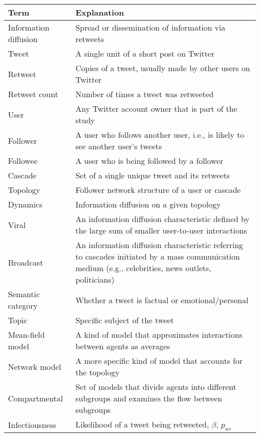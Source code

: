 \documentclass[11pt,a4paper]{article}
\begin{document}
\begin{table}[h]
    \hypertarget{fig:table1}{}
    \label{tab:table1}
    \centering
    \small
    \begin{tabularx}{\textwidth}{|l|X|}
        \hline
        \textbf{Term} & \textbf{Explanation} \\
        \hline
        Information diffusion & Spread or dissemination of information via retweets  \\
        Tweet & A single unit of a short post on Twitter \\
        Retweet & Copies of a tweet, usually made by other users on Twitter \\
        Retweet count & Number of times a tweet was retweeted \\
        User & Any Twitter account owner that is part of the study \\
        Follower & A user who follows another user, i.e., is likely to see another user's tweets \\
        Followee & A user who is being followed by a follower \\
        Cascade & Set of a single unique tweet and its retweets \\
        Topology & Follower network structure of a user or cascade \\
        Dynamics & Information diffusion on a given topology \\
        Viral & An information diffusion characteristic defined by the large sum of smaller user-to-user interactions \\
        Broadcast & An information diffusion characteristic referring to cascades initiated by a mass communication medium (e.g., celebrities, news outlets, politicians) \\
        Semantic category & Whether a tweet is factual or emotional/personal \\
        Topic & Specific subject of the tweet \\
        Mean-field model & A kind of model that approximates interactions between agents as averages \\
        Network model & A more specific kind of model that accounts for the topology \\
        Compartmental & Set of models that divide agents into different subgroups and examines the flow between subgroups \\
        Infectiousness  & Likelihood of a tweet being retweeted, $\beta$, $p_{uv}$ \\

\end{tabularx}
\end{table}
\end{document}
